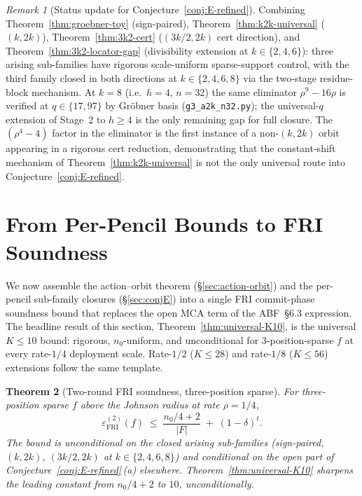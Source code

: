 \documentclass[11pt]{article}
\newtheorem{theorem}{Theorem}[section]
\theoremstyle{definition}
\theoremstyle{remark}
\newtheorem{remark}[theorem]{Remark}
\begin{document}
\begin{remark}[Status update for Conjecture~\ref{conj:E-refined}]
\label{rem:conjE-status-3k2}
Combining Theorem~\ref{thm:groebner-toy} (sign-paired),
Theorem~\ref{thm:k2k-universal} ($(k, 2k)$),
Theorem~\ref{thm:3k2-cert} ($(3k/2, 2k)$ cert direction), and
Theorem~\ref{thm:3k2-locator-gap} (divisibility extension at $k \in
\{2, 4, 6\}$): three arising sub-families have rigorous scale-uniform
sparse-support control, with the third family closed in both directions
at $k \in \{2, 4, 6, 8\}$ via the two-stage residue-block mechanism.
At $k = 8$ (i.e.\ $h = 4$, $n = 32$) the same eliminator
$\rho^9 - 16\rho$ is verified at $q \in \{17, 97\}$ by Gr\"obner basis
(\texttt{g3\_a2k\_n32.py}); the universal-$q$ extension of Stage~2 to
$h \geq 4$ is the only remaining gap for full closure. The
$(\rho^4 - 4)$ factor in the eliminator is the first instance of a
non-$(k, 2k)$ orbit appearing in a rigorous cert reduction, demonstrating
that the constant-shift mechanism of Theorem~\ref{thm:k2k-universal} is
not the only universal route into Conjecture~\ref{conj:E-refined}.
\end{remark}

\section{From Per-Pencil Bounds to FRI Soundness}
\label{sec:universal}

\noindent We now assemble the action--orbit theorem
(\S\ref{sec:action-orbit}) and the per-pencil sub-family closures
(\S\ref{sec:conjE}) into a single FRI commit-phase soundness bound
that replaces the open MCA term of the ABF~\S 6.3 expression. The
headline result of this section, Theorem~\ref{thm:universal-K10},
is the universal $K \leq 10$ bound: rigorous, $n_0$-uniform, and
unconditional for $3$-position-sparse $f$ at every rate-$1/4$
deployment scale. Rate-$1/2$ ($K \leq 28$) and rate-$1/8$
($K \leq 56$) extensions follow the same template.

\begin{theorem}[Two-round FRI soundness, three-position sparse]
\label{thm:universal}
For three-position sparse $f$ above the Johnson radius at rate
$\rho = 1/4$,
\[
 \varepsilon_{\mathrm{FRI}}^{(2)}(f) \;\leq\;
 \frac{n_0/4 + 2}{|F|} \;+\; (1 - \delta)^{t}.
\]
The bound is unconditional on the closed arising sub-families
(sign-paired, $(k, 2k)$, $(3k/2, 2k)$ at $k \in \{2, 4, 6, 8\}$) and
conditional on the open part of Conjecture~\ref{conj:E-refined}\,(a)
elsewhere. Theorem~\ref{thm:universal-K10} sharpens the leading
constant from $n_0/4 + 2$ to $10$, unconditionally.
\end{theorem}
\end{document}
